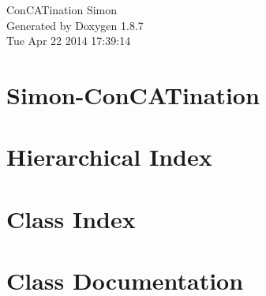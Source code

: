 \documentclass[twoside]{book}
\newcommand{\+}{\discretionary{\mbox{\scriptsize$\hookleftarrow$}}{}{}}
\newcommand{\clearemptydoublepage}{%
  \newpage{\pagestyle{empty}\cleardoublepage}%
}
\begin{document}
\hypersetup{pageanchor=false,
             bookmarks=true,
             bookmarksnumbered=true,
             pdfencoding=unicode
            }
\begin{titlepage}
\vspace*{7cm}
\begin{center}%
{\Large Con\+C\+A\+Tination Simon }\\
\vspace*{1cm}
{\large Generated by Doxygen 1.8.7}\\
\vspace*{0.5cm}
{\small Tue Apr 22 2014 17:39:14}\\
\end{center}
\end{titlepage}
\clearemptydoublepage
\tableofcontents
\clearemptydoublepage
{}
\hypersetup{pageanchor=true}

\chapter{Simon-\/\+Con\+C\+A\+Tination}
\label{md__r_e_a_d_m_e}
\hypertarget{md__r_e_a_d_m_e}{}

\chapter{Hierarchical Index}

\chapter{Class Index}

\chapter{Class Documentation}











































\newpage
{}
{}
\printindex
\end{document}
